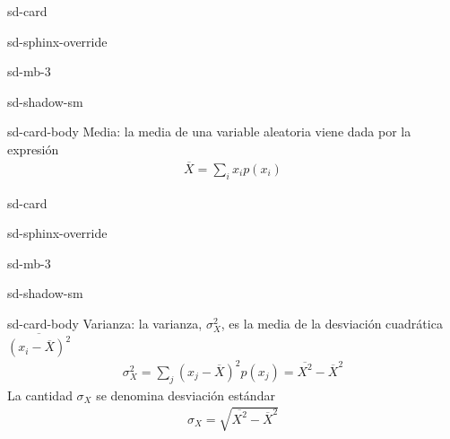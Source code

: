 \documentclass[letterpaper,10pt,english]{jupyterBook}
\begin{document}
\begin{sphinxuseclass}{sd-card}
\begin{sphinxuseclass}{sd-sphinx-override}
\begin{sphinxuseclass}{sd-mb-3}
\begin{sphinxuseclass}{sd-shadow-sm}
\begin{sphinxuseclass}{sd-card-body}
\sphinxAtStartPar
Media: la media de una variable aleatoria  viene dada por la expresión
\begin{equation*}
\begin{split}
\overline X  = \sum_i x_i p(x_i)
\end{split}
\end{equation*}
\end{sphinxuseclass}
\end{sphinxuseclass}
\end{sphinxuseclass}
\end{sphinxuseclass}
\end{sphinxuseclass}
\begin{sphinxuseclass}{sd-card}
\begin{sphinxuseclass}{sd-sphinx-override}
\begin{sphinxuseclass}{sd-mb-3}
\begin{sphinxuseclass}{sd-shadow-sm}
\begin{sphinxuseclass}{sd-card-body}
\sphinxAtStartPar
Varianza: la varianza, \(\sigma_X^2\), es la media de la desviación cuadrática \(\overline{(x_i - \overline{X} )^2}\)
\begin{equation*}
\begin{split} 
\sigma^2_X = \sum_j (x_j-\overline{X})^2 p(x_j) = \overline{X^2} - \overline{X}^2
\end{split}
\end{equation*}
\sphinxAtStartPar
La cantidad \(\sigma_X\) se denomina  desviación estándar
\begin{equation*}
\begin{split}
\sigma_X = \sqrt{\overline{X^2} - \overline{X}^2}
\end{split}
\end{equation*}
\end{sphinxuseclass}
\end{sphinxuseclass}
\end{sphinxuseclass}
\end{sphinxuseclass}
\end{sphinxuseclass}
\end{document}

